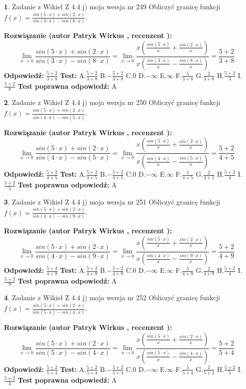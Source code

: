\documentclass[12pt, a4paper]{article}
\theoremstyle{definition} %
\newtheorem{zad}{}
\newcommand{\zadStart}[1]{\begin{zad}#1\newline}
\newcommand{\zadStop}{\end{zad}}
\newcommand{\rozwStart}[2]{\noindent \textbf{Rozwiązanie (autor #1 , recenzent #2): }\newline}
\newcommand{\rozwStop}{\newline}
\newcommand{\odpStart}{\noindent \textbf{Odpowiedź:}\newline}
\newcommand{\odpStop}{\newline}
\newcommand{\testStart}{\noindent \textbf{Test:}\newline}
\newcommand{\testStop}{\newline}
\newcommand{\kluczStart}{\noindent \textbf{Test poprawna odpowiedź:}\newline}
\newcommand{\kluczStop}{\newline}
\begin{document}
\zadStart{Zadanie z Wikieł Z 4.4 j) moja wersja nr 249}
Obliczyć granicę funkcji $f(x)=\frac{sin(5\cdot x) +sin(2\cdot x)}{sin(3\cdot x) -sin(8\cdot x)}$.
\zadStop
\rozwStart{Patryk Wirkus}{}
$$\lim\limits_{x\to 0}\frac{sin(5\cdot x) +sin(2\cdot x)}{sin(3\cdot x) -sin(8\cdot x)}=\lim\limits_{x\to 0}\frac{x(\frac{sin(5\cdot x)}{x}+\frac{sin(2\cdot x)}{x})}{x(\frac{sin(3\cdot x)}{x}-\frac{sin(8\cdot x)}{x})}=\frac{5+2}{3+8}$$
\rozwStop
\odpStart
$\frac{5+2}{3+8}$
\odpStop
\testStart
A.$\frac{5+2}{3+8}$
B.$-\frac{5+2}{3+8}$
C.$0$
D.$-\infty$
E.$\infty$
F.$\frac{5}{3+8}$
G.$\frac{2}{3+8}$
H.$\frac{5+2}{3}$
I.$\frac{5+2}{8}$
\testStop
\kluczStart
A
\kluczStop



\zadStart{Zadanie z Wikieł Z 4.4 j) moja wersja nr 250}
Obliczyć granicę funkcji $f(x)=\frac{sin(5\cdot x) +sin(2\cdot x)}{sin(4\cdot x) -sin(5\cdot x)}$.
\zadStop
\rozwStart{Patryk Wirkus}{}
$$\lim\limits_{x\to 0}\frac{sin(5\cdot x) +sin(2\cdot x)}{sin(4\cdot x) -sin(5\cdot x)}=\lim\limits_{x\to 0}\frac{x(\frac{sin(5\cdot x)}{x}+\frac{sin(2\cdot x)}{x})}{x(\frac{sin(4\cdot x)}{x}-\frac{sin(5\cdot x)}{x})}=\frac{5+2}{4+5}$$
\rozwStop
\odpStart
$\frac{5+2}{4+5}$
\odpStop
\testStart
A.$\frac{5+2}{4+5}$
B.$-\frac{5+2}{4+5}$
C.$0$
D.$-\infty$
E.$\infty$
F.$\frac{5}{4+5}$
G.$\frac{2}{4+5}$
H.$\frac{5+2}{4}$
I.$\frac{5+2}{5}$
\testStop
\kluczStart
A
\kluczStop



\zadStart{Zadanie z Wikieł Z 4.4 j) moja wersja nr 251}
Obliczyć granicę funkcji $f(x)=\frac{sin(5\cdot x) +sin(2\cdot x)}{sin(4\cdot x) -sin(9\cdot x)}$.
\zadStop
\rozwStart{Patryk Wirkus}{}
$$\lim\limits_{x\to 0}\frac{sin(5\cdot x) +sin(2\cdot x)}{sin(4\cdot x) -sin(9\cdot x)}=\lim\limits_{x\to 0}\frac{x(\frac{sin(5\cdot x)}{x}+\frac{sin(2\cdot x)}{x})}{x(\frac{sin(4\cdot x)}{x}-\frac{sin(9\cdot x)}{x})}=\frac{5+2}{4+9}$$
\rozwStop
\odpStart
$\frac{5+2}{4+9}$
\odpStop
\testStart
A.$\frac{5+2}{4+9}$
B.$-\frac{5+2}{4+9}$
C.$0$
D.$-\infty$
E.$\infty$
F.$\frac{5}{4+9}$
G.$\frac{2}{4+9}$
H.$\frac{5+2}{4}$
I.$\frac{5+2}{9}$
\testStop
\kluczStart
A
\kluczStop



\zadStart{Zadanie z Wikieł Z 4.4 j) moja wersja nr 252}
Obliczyć granicę funkcji $f(x)=\frac{sin(5\cdot x) +sin(2\cdot x)}{sin(5\cdot x) -sin(4\cdot x)}$.
\zadStop
\rozwStart{Patryk Wirkus}{}
$$\lim\limits_{x\to 0}\frac{sin(5\cdot x) +sin(2\cdot x)}{sin(5\cdot x) -sin(4\cdot x)}=\lim\limits_{x\to 0}\frac{x(\frac{sin(5\cdot x)}{x}+\frac{sin(2\cdot x)}{x})}{x(\frac{sin(5\cdot x)}{x}-\frac{sin(4\cdot x)}{x})}=\frac{5+2}{5+4}$$
\rozwStop
\odpStart
$\frac{5+2}{5+4}$
\odpStop
\testStart
A.$\frac{5+2}{5+4}$
B.$-\frac{5+2}{5+4}$
C.$0$
D.$-\infty$
E.$\infty$
F.$\frac{5}{5+4}$
G.$\frac{2}{5+4}$
H.$\frac{5+2}{5}$
I.$\frac{5+2}{4}$
\testStop
\kluczStart
A
\kluczStop
\end{document}
